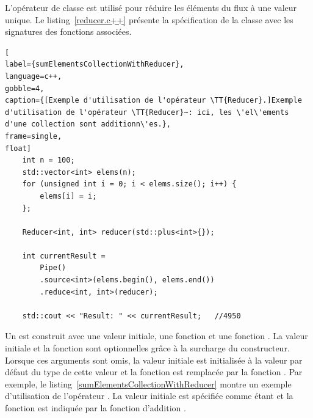 
L'op\'erateur de classe  est utilis\'e pour r\'eduire les \'el\'ements du flux \`a une valeur unique. Le listing~\ref{reducer.c++} présente la spécification  de la classe  avec les signatures des fonctions associées. 


\begin{lstlisting}[
label={sumElementsCollectionWithReducer},
language=c++,
gobble=4,
caption={[Exemple d'utilisation de l'opérateur \TT{Reducer}.]Exemple
d'utilisation de l'opérateur \TT{Reducer}~: ici, les \'el\'ements d'une collection sont additionn\'es.},
frame=single,
float]
    int n = 100;
    std::vector<int> elems(n);
    for (unsigned int i = 0; i < elems.size(); i++) {
        elems[i] = i;
    };

    Reducer<int, int> reducer(std::plus<int>{});

    int currentResult =
        Pipe()
        .source<int>(elems.begin(), elems.end())
        .reduce<int, int>(reducer);

	std::cout << "Result: " << currentResult;	//4950   
\end{lstlisting}



Un  est construit avec une valeur initiale, une fonction  et une fonction . La valeur initiale et la fonction  sont optionnelles gr\^ace \`a la surcharge du constructeur. Lorsque ces arguments sont omis, la valeur initiale est initialis\'ee \`a la valeur par d\'efaut du type de cette valeur et la fonction  est remplac\'ee par la fonction . Par exemple, le listing~\ref{sumElementsCollectionWithReducer} montre un exemple d'utilisation de l'op\'erateur . La valeur initiale est sp\'ecifi\'ee comme \'etant  et la fonction  est indiqu\'ee par la fonction d'addition . 


